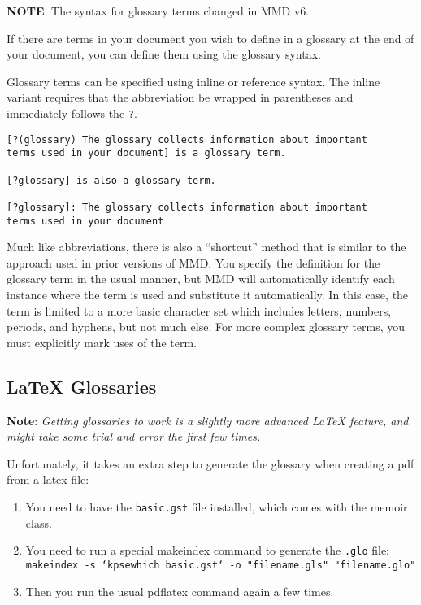 \textbf{NOTE}: The syntax for glossary terms changed in \gls{MMD} v6.

If there are terms in your document you wish to define in a \gls{glossary} at the end of your document, you can define them using the glossary syntax.

Glossary terms can be specified using inline or reference syntax. The inline variant requires that the abbreviation be wrapped in parentheses and immediately follows the \texttt{?}.

\begin{verbatim}
[?(glossary) The glossary collects information about important
terms used in your document] is a glossary term.

[?glossary] is also a glossary term.

[?glossary]: The glossary collects information about important
terms used in your document
\end{verbatim}

Much like abbreviations, there is also a ``shortcut'' method that is similar to the approach used in prior versions of \gls{MMD}. You specify the definition for the glossary term in the usual manner, but \gls{MMD} will automatically identify each instance where the term is used and substitute it automatically. In this case, the term is limited to a more basic character set which includes letters, numbers, periods, and hyphens, but not much else. For more complex glossary terms, you must explicitly mark uses of the term.

\subsection{LaTeX Glossaries}
\label{latexglossaries}

\textbf{Note}: \emph{Getting glossaries to work is a slightly more advanced LaTeX
feature, and might take some trial and error the first few times.}

Unfortunately, it takes an extra step to generate the glossary when creating a
pdf from a latex file:

\begin{enumerate}
\item You need to have the \texttt{basic.gst} file installed, which comes with the
memoir class.

\item You need to run a special makeindex command to generate the \texttt{.glo} file:
\texttt{makeindex -s `kpsewhich basic.gst` -o "filename.gls" "filename.glo"}

\item Then you run the usual pdflatex command again a few times.

\end{enumerate}

